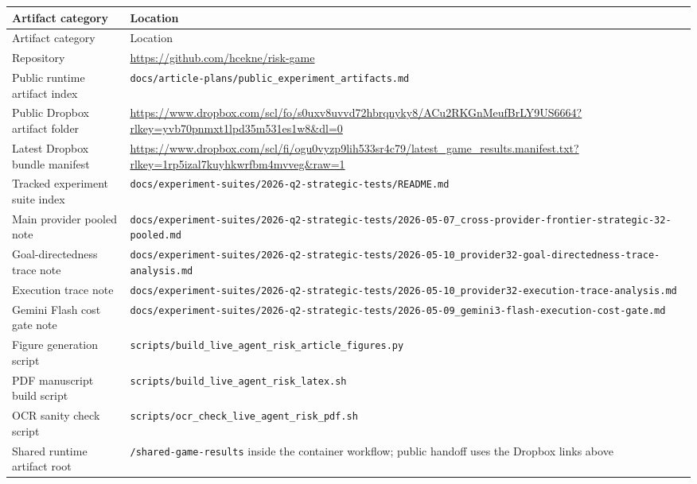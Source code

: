 \documentclass[11pt]{article}
\begin{document}
\small
\begin{longtable}{>{\raggedright\arraybackslash}p{3.2cm} >{\raggedright\arraybackslash}p{10.5cm}}
\toprule
Artifact category & Location \\
\midrule
\endfirsthead
\toprule
Artifact category & Location \\
\midrule
\endhead
Repository & \url{https://github.com/hcekne/risk-game} \\
Public runtime artifact index & \nolinkurl{docs/article-plans/public_experiment_artifacts.md} \\
Public Dropbox artifact folder & \url{https://www.dropbox.com/scl/fo/s0uxv8uvvd72hbrqnyky8/ACu2RKGnMeufBrLY9US6664?rlkey=yvb70pnmxt1lpd35m531es1w8&dl=0} \\
Latest Dropbox bundle manifest & \url{https://www.dropbox.com/scl/fi/ogu0vyzp9lih533sr4c79/latest_game_results.manifest.txt?rlkey=1rp5izal7kuyhkwrfbm4mvveg&raw=1} \\
Tracked experiment suite index & \nolinkurl{docs/experiment-suites/2026-q2-strategic-tests/README.md} \\
Main provider pooled note & \nolinkurl{docs/experiment-suites/2026-q2-strategic-tests/2026-05-07_cross-provider-frontier-strategic-32-pooled.md} \\
Goal-directedness trace note & \nolinkurl{docs/experiment-suites/2026-q2-strategic-tests/2026-05-10_provider32-goal-directedness-trace-analysis.md} \\
Execution trace note & \nolinkurl{docs/experiment-suites/2026-q2-strategic-tests/2026-05-10_provider32-execution-trace-analysis.md} \\
Gemini Flash cost gate note & \nolinkurl{docs/experiment-suites/2026-q2-strategic-tests/2026-05-09_gemini3-flash-execution-cost-gate.md} \\
Figure generation script & \nolinkurl{scripts/build_live_agent_risk_article_figures.py} \\
PDF manuscript build script & \nolinkurl{scripts/build_live_agent_risk_latex.sh} \\
OCR sanity check script & \nolinkurl{scripts/ocr_check_live_agent_risk_pdf.sh} \\
Shared runtime artifact root & \nolinkurl{/shared-game-results} inside the container workflow; public handoff uses the Dropbox links above \\
\bottomrule
\end{longtable}
\normalsize



\end{document}
